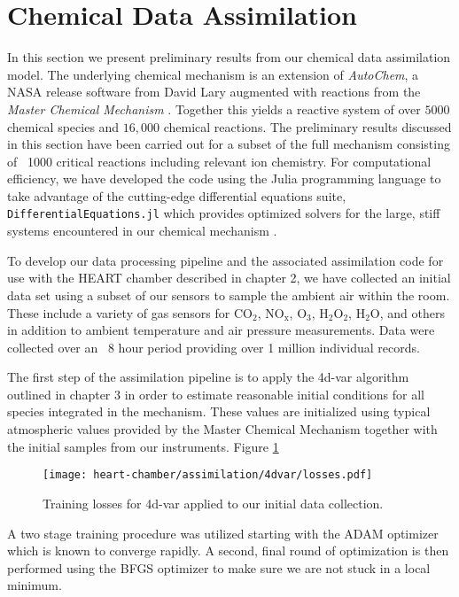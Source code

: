 


\section{Chemical Data Assimilation}

In this section we present preliminary results from our chemical data assimilation model. The underlying chemical mechanism is an extension of \textit{AutoChem}, a NASA release software from David Lary \cite{Lary1999a, Lary2003a} augmented with reactions from the \textit{Master Chemical Mechanism} \cite{mcm-v3}. Together this yields a reactive system of over $5000$ chemical species and $16,000$ chemical reactions. The preliminary results discussed in this section have been carried out for a subset of the full mechanism consisting of ~1000 critical reactions including relevant ion chemistry. For computational efficiency, we have developed the code using the Julia programming language to take advantage of the cutting-edge differential equations suite, \texttt{DifferentialEquations.jl} which provides optimized solvers for the large, stiff systems encountered in our chemical mechanism \cite{differentialequations.jl}.

To develop our data processing pipeline and the associated assimilation code for use with the HEART chamber described in chapter 2, we have collected an initial data set using a subset of our sensors to sample the ambient air within the room. These include a variety of gas sensors for $\mathrm{CO_2}$, $\mathrm{NO_x}$, $\mathrm{O_3}$, $\mathrm{H_2O_2}$, $\mathrm{H_2O}$, and others in addition to ambient temperature and air pressure measurements. Data were collected over an ~8 hour period providing over 1 million individual records.

The first step of the assimilation pipeline is to apply the 4d-var algorithm outlined in chapter 3 in order to estimate reasonable initial conditions for all species integrated in the mechanism. These values are initialized using typical atmospheric values provided by the Master Chemical Mechanism together with the initial samples from our instruments. Figure \ref{fig:4d-var}
\begin{figure}[!hbt]
  \centering
  \texttt{[image: heart-chamber/assimilation/4dvar/losses.pdf]}
  \caption{Training losses for 4d-var applied to our initial data collection.}
  \label{fig:4d-var}
\end{figure}
A two stage training procedure was utilized starting with the ADAM optimizer which is known to converge rapidly. A second, final round of optimization is then performed using the BFGS optimizer to make sure we are not stuck in a local minimum.

